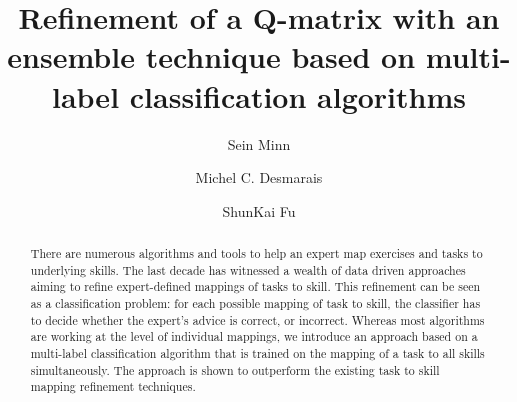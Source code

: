 \documentclass[runningheads,a4paper]{llncs}
\begin{document}


\title{Refinement of a Q-matrix with an ensemble technique based on multi-label classification algorithms}
{}


%
\author{Sein Minn \and Michel C. Desmarais \and ShunKai Fu }


			
\maketitle

\begin{abstract}

There are numerous algorithms and tools to help an expert map exercises and tasks to underlying skills.  The last decade has witnessed a wealth of data driven approaches aiming to refine expert-defined mappings of tasks to skill.  This refinement can be seen as a classification problem: for each possible mapping of task to skill, the classifier has to decide whether the expert's advice is correct, or incorrect. Whereas most algorithms are working at the level of individual mappings, we introduce an approach based on a multi-label classification algorithm that is trained on the mapping of a task to all skills simultaneously.  The approach is shown to outperform the existing task to skill mapping refinement techniques.

  
\end{abstract}

\end{document}
